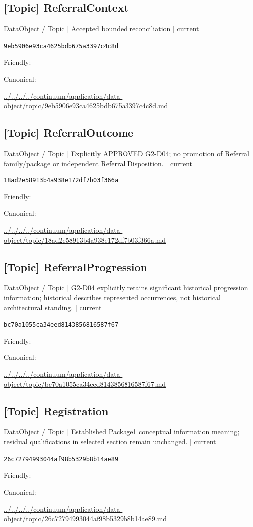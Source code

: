 \documentclass[10pt,a4paper]{article}
\begin{document}
\subsection*{[Topic] ReferralContext}
{\small DataObject / Topic | Accepted bounded reconciliation | current}\par
\texttt{9eb5906e93ca4625bdb675a3397c4c8d}\par
Friendly: \par
Canonical: \par
{\footnotesize\url{../../../../continuum/application/data-object/topic/9eb5906e93ca4625bdb675a3397c4c8d.md}}\par
\subsection*{[Topic] ReferralOutcome}
{\small DataObject / Topic | Explicitly APPROVED G2-D04; no promotion of Referral family/package or independent Referral Disposition. | current}\par
\texttt{18ad2e58913b4a938e172df7b03f366a}\par
Friendly: \par
Canonical: \par
{\footnotesize\url{../../../../continuum/application/data-object/topic/18ad2e58913b4a938e172df7b03f366a.md}}\par
\subsection*{[Topic] ReferralProgression}
{\small DataObject / Topic | G2-D04 explicitly retains significant historical progression information; historical describes represented occurrences, not historical architectural standing. | current}\par
\texttt{bc70a1055ca34eed8143856816587f67}\par
Friendly: \par
Canonical: \par
{\footnotesize\url{../../../../continuum/application/data-object/topic/bc70a1055ca34eed8143856816587f67.md}}\par
\subsection*{[Topic] Registration}
{\small DataObject / Topic | Established Package1 conceptual information meaning; residual qualifications in selected section remain unchanged. | current}\par
\texttt{26c72794993044af98b5329b8b14ae89}\par
Friendly: \par
Canonical: \par
{\footnotesize\url{../../../../continuum/application/data-object/topic/26c72794993044af98b5329b8b14ae89.md}}\par
\end{document}
